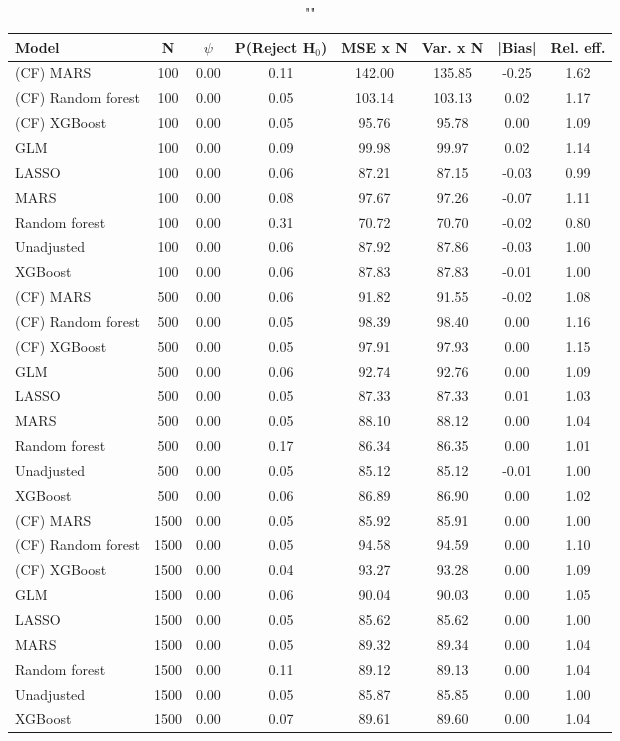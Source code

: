 \begin{table}
\centering
\caption{""}
\begin{tabular}{lccccccc}
\toprule
Model & N & $\psi$ & P(Reject H$_0$) & MSE x N & Var. x N & |Bias| & Rel. eff.\\ \midrule
(CF) MARS & 100 & 0.00 & 0.11 & 142.00 & 135.85 & -0.25 & 1.62 \\ 
(CF) Random forest & 100 & 0.00 & 0.05 & 103.14 & 103.13 &  0.02 & 1.17 \\ 
(CF) XGBoost & 100 & 0.00 & 0.05 &  95.76 &  95.78 &  0.00 & 1.09 \\ 
GLM & 100 & 0.00 & 0.09 &  99.98 &  99.97 &  0.02 & 1.14 \\ 
LASSO & 100 & 0.00 & 0.06 &  87.21 &  87.15 & -0.03 & 0.99 \\ 
MARS & 100 & 0.00 & 0.08 &  97.67 &  97.26 & -0.07 & 1.11 \\ 
Random forest & 100 & 0.00 & 0.31 &  70.72 &  70.70 & -0.02 & 0.80 \\ 
Unadjusted & 100 & 0.00 & 0.06 &  87.92 &  87.86 & -0.03 & 1.00 \\ 
XGBoost & 100 & 0.00 & 0.06 &  87.83 &  87.83 & -0.01 & 1.00 \\ \addlinespace 
(CF) MARS & 500 & 0.00 & 0.06 &  91.82 &  91.55 & -0.02 & 1.08 \\ 
(CF) Random forest & 500 & 0.00 & 0.05 &  98.39 &  98.40 &  0.00 & 1.16 \\ 
(CF) XGBoost & 500 & 0.00 & 0.05 &  97.91 &  97.93 &  0.00 & 1.15 \\ 
GLM & 500 & 0.00 & 0.06 &  92.74 &  92.76 &  0.00 & 1.09 \\ 
LASSO & 500 & 0.00 & 0.05 &  87.33 &  87.33 &  0.01 & 1.03 \\ 
MARS & 500 & 0.00 & 0.05 &  88.10 &  88.12 &  0.00 & 1.04 \\ 
Random forest & 500 & 0.00 & 0.17 &  86.34 &  86.35 &  0.00 & 1.01 \\ 
Unadjusted & 500 & 0.00 & 0.05 &  85.12 &  85.12 & -0.01 & 1.00 \\ 
XGBoost & 500 & 0.00 & 0.06 &  86.89 &  86.90 &  0.00 & 1.02 \\ \addlinespace 
(CF) MARS & 1500 & 0.00 & 0.05 &  85.92 &  85.91 &  0.00 & 1.00 \\ 
(CF) Random forest & 1500 & 0.00 & 0.05 &  94.58 &  94.59 &  0.00 & 1.10 \\ 
(CF) XGBoost & 1500 & 0.00 & 0.04 &  93.27 &  93.28 &  0.00 & 1.09 \\ 
GLM & 1500 & 0.00 & 0.06 &  90.04 &  90.03 &  0.00 & 1.05 \\ 
LASSO & 1500 & 0.00 & 0.05 &  85.62 &  85.62 &  0.00 & 1.00 \\ 
MARS & 1500 & 0.00 & 0.05 &  89.32 &  89.34 &  0.00 & 1.04 \\ 
Random forest & 1500 & 0.00 & 0.11 &  89.12 &  89.13 &  0.00 & 1.04 \\ 
Unadjusted & 1500 & 0.00 & 0.05 &  85.87 &  85.85 &  0.00 & 1.00 \\ 
XGBoost & 1500 & 0.00 & 0.07 &  89.61 &  89.60 &  0.00 & 1.04 \\
\bottomrule
\end{tabular}
\end{table}

